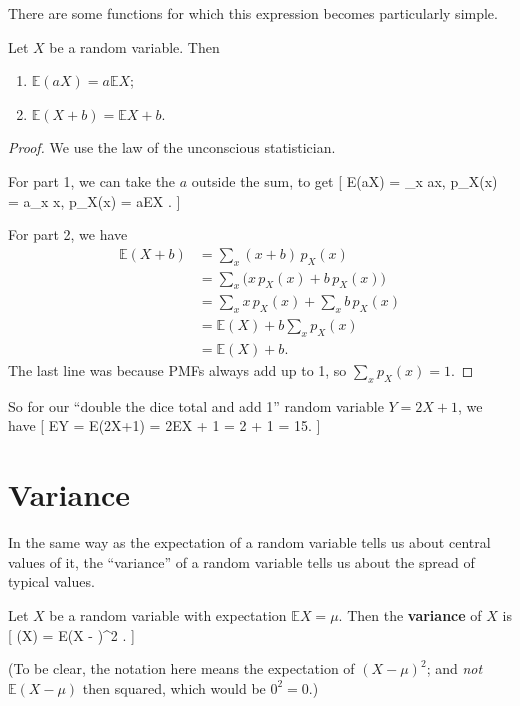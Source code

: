 \documentclass[
  letterpaper,
  DIV=11,
  numbers=noendperiod]{scrreprt}
\providecommand{\tightlist}{%
  \setlength{\itemsep}{0pt}\setlength{\parskip}{0pt}}\usepackage{longtable,booktabs,array}
\theoremstyle{remark}
\begin{document}
There are some functions for which this expression becomes particularly
simple.

\leavevmode{}%
Let \(X\) be a random variable. Then

\begin{enumerate}
\def\labelenumi{\arabic{enumi}.}
\tightlist
\item
  \(\mathbb E(aX) = a\mathbb EX\);
\item
  \(\mathbb E(X + b) = \mathbb EX + b\).
\end{enumerate}

\begin{proof}

We use the law of the unconscious statistician.

For part 1, we can take the \(a\) outside the sum, to get {[}
\mathbb E(aX) = \sum\_x ax, p\_X(x) = a\sum\_x x, p\_X(x) = a\mathbb EX
. {]}

For part 2, we have \begin{align*}
  \mathbb E(X+b) &= \sum_x (x + b)\, p_X(x) \\
    &= \sum_x \big( x\, p_X(x) + b\,p_X(x) \big) \\
    &= \sum_x x\, p_X(x) + \sum_x b\,p_X(x) \\
    &= \mathbb E(X) + b \sum_x p_X(x) \\
    &= \mathbb E(X) + b .
\end{align*} The last line was because PMFs always add up to 1, so
\(\sum_x p_X(x) = 1\).

\end{proof}

So for our ``double the dice total and add 1'' random variable
\(Y = 2X + 1\), we have {[} \mathbb EY = \mathbb E(2X+1) = 2\mathbb EX +
1 = 2 + 1 = 15. {]}

\hypertarget{variance}{%
\section{Variance}\label{variance}}

In the same way as the expectation of a random variable tells us about
central values of it, the ``variance'' of a random variable tells us
about the spread of typical values.

Let \(X\) be a random variable with expectation \(\mathbb EX = \mu\).
Then the \textbf{variance} of \(X\) is {[} \Var(X) = \mathbb E(X -
\mu)\^{}2 . {]}

(To be clear, the notation here means the expectation of \((X-\mu)^2\);
and \emph{not} \(\mathbb E(X - \mu)\) then squared, which would be
\(0^2 = 0\).)
\end{document}
